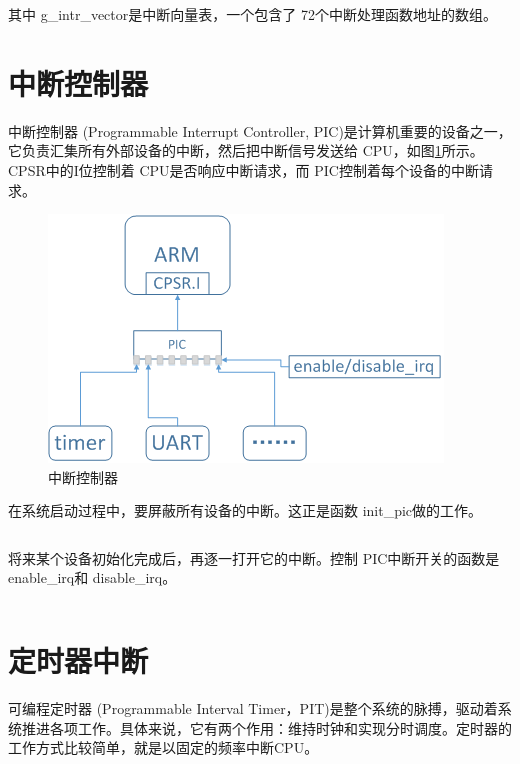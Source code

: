 \documentclass[main.tex]{subfiles}
\begin{document}
\begin{CJK*}{UTF8}{song}
\noindent
其中 g\_\-intr\_\-vector是中断向量表，一个包含了 72个中断处理函数地址的数组。

\section{中断控制器}
中断控制器 (Programmable Interrupt Controller, PIC)是计算机重要的设备之一，它负责汇集所有外部设备的中断，然后把中断信号发送给 CPU，如图\ref{figure:3-5}所示。 CPSR中的I位控制着 CPU是否响应中断请求，而 PIC控制着每个设备的中断请求。

\begin{figure}[htp]
\centering
\includegraphics[scale=0.3]{figures/3-5}
\caption{中断控制器}
\label{figure:3-5}
\end{figure}

在系统启动过程中，要屏蔽所有设备的中断。这正是函数 init\_\-pic做的工作。

\begin{code}
\label{code:3-16}
\inputminted[firstline=50,lastline=59,linenos,numbersep=5pt,frame=lines,framesep=2mm]{c}{src/chapter03/kernel/machdep.c}
\end{code}

将来某个设备初始化完成后，再逐一打开它的中断。控制 PIC中断开关的函数是 enable\_\-irq和 disable\_\-irq。

\begin{code}
\label{code:3-17}
\inputminted[firstline=61,lastline=89,linenos,numbersep=5pt,frame=lines,framesep=2mm]{c}{src/chapter03/kernel/machdep.c}
\end{code}

\section{定时器中断}
可编程定时器 (Programmable Interval Timer，PIT)是整个系统的脉搏，驱动着系统推进各项工作。具体来说，它有两个作用：维持时钟和实现分时调度。定时器的工作方式比较简单，就是以固定的频率中断CPU。


\end{CJK*}
\end{document}
